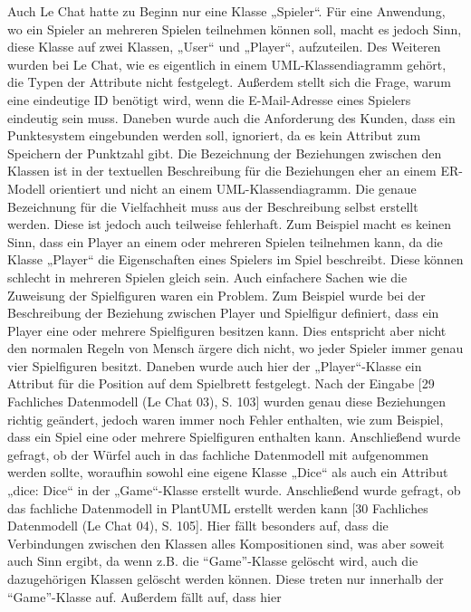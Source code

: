 Auch Le Chat hatte zu Beginn nur eine Klasse „Spieler“. Für eine Anwendung, wo ein Spieler an mehreren Spielen teilnehmen können soll, 
macht es jedoch Sinn, diese Klasse auf zwei Klassen, „User“ und „Player“, aufzuteilen. Des Weiteren wurden bei Le Chat, wie es eigentlich 
in einem UML-Klassendiagramm gehört, die Typen der Attribute nicht festgelegt. Außerdem stellt sich die Frage, warum eine eindeutige 
ID benötigt wird, wenn die E-Mail-Adresse eines Spielers eindeutig sein muss. Daneben wurde auch die Anforderung des Kunden, dass ein 
Punktesystem eingebunden werden soll, ignoriert, da es kein Attribut zum Speichern der Punktzahl gibt. Die Bezeichnung der Beziehungen 
zwischen den Klassen ist in der textuellen Beschreibung für die Beziehungen eher an einem ER-Modell orientiert und nicht an einem 
UML-Klassendiagramm. Die genaue Bezeichnung für die Vielfachheit muss aus der Beschreibung selbst erstellt werden. Diese ist jedoch auch 
teilweise fehlerhaft. Zum Beispiel macht es keinen Sinn, dass ein Player an einem oder mehreren Spielen teilnehmen kann, da die Klasse 
„Player“ die Eigenschaften eines Spielers im Spiel beschreibt. Diese können schlecht in mehreren Spielen gleich sein. Auch einfachere 
Sachen wie die Zuweisung der Spielfiguren waren ein Problem. Zum Beispiel wurde bei der Beschreibung der Beziehung zwischen Player und 
Spielfigur definiert, dass ein Player eine oder mehrere Spielfiguren besitzen kann. Dies entspricht aber nicht den normalen Regeln von 
Mensch ärgere dich nicht, wo jeder Spieler immer genau vier Spielfiguren besitzt. Daneben wurde auch hier der „Player“-Klasse ein Attribut 
für die Position auf dem Spielbrett festgelegt. Nach der Eingabe [29 Fachliches Datenmodell (Le Chat 03), S. 103] wurden genau diese 
Beziehungen richtig geändert, jedoch waren immer noch Fehler enthalten, wie zum Beispiel, dass ein Spiel eine oder mehrere Spielfiguren 
enthalten kann. Anschließend wurde gefragt, ob der Würfel auch in das fachliche Datenmodell mit aufgenommen werden sollte, woraufhin 
sowohl eine eigene Klasse „Dice“ als auch ein Attribut „dice: Dice“ in der „Game“-Klasse erstellt wurde. Anschließend wurde gefragt, ob 
das fachliche Datenmodell in PlantUML erstellt werden kann [30 Fachliches Datenmodell (Le Chat 04), S. 105]. Hier fällt besonders auf, 
dass die Verbindungen zwischen den Klassen alles Kompositionen sind, was aber soweit auch Sinn ergibt, da wenn z.B. die ``Game''-Klasse 
gelöscht wird, auch die dazugehörigen Klassen gelöscht werden können. Diese treten nur innerhalb der ``Game''-Klasse auf. Außerdem fällt auf, dass hier 
